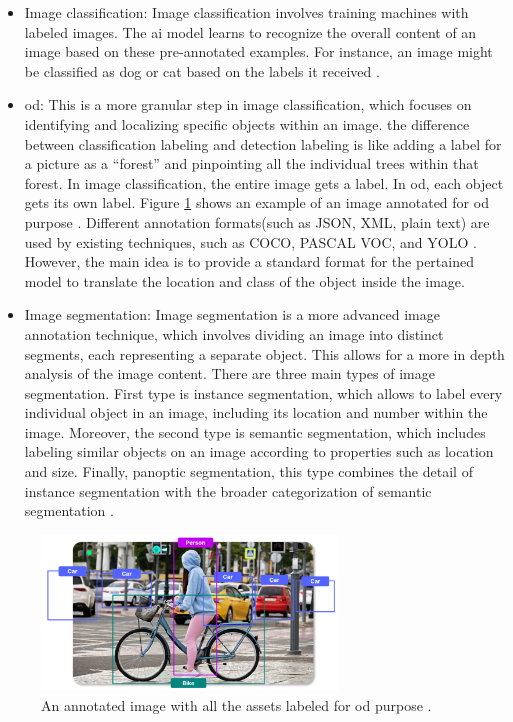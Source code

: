 \begin{itemize}
    \item Image classification: Image classification involves training machines with labeled images. The \gls{ai} model learns to recognize the overall content of an image based on these pre-annotated examples. For instance, an image might be classified as dog or cat based on the labels it received \cite{Annotation_Tech}. 
    \item \gls{od}: This is a more granular step in image classification, which focuses on identifying and localizing specific objects within an image. the difference between  classification labeling and detection labeling is like adding a label for a picture as a “forest” and pinpointing all the individual trees within that forest. In image classification, the entire image gets a label. In \gls{od}, each object gets its own label. Figure \ref{OD_Labeling} shows an example of an image annotated for \gls{od} purpose \cite{Annotation_Tech}. Different annotation formats(such as JSON, XML, plain text) are used by existing techniques, such as COCO, PASCAL VOC, and YOLO \cite{oD_Review}. However, the main idea is to provide a standard format for the pertained model to translate the location and class of the object inside the image.
    \item Image segmentation: Image segmentation is a more advanced image annotation technique, which involves dividing an image into distinct segments, each representing a separate object. This allows for a more in depth analysis of the image content. There are three main types of image segmentation. First type is instance segmentation, which allows to label every individual object in an image, including its location and number within the image. Moreover, the second type is semantic segmentation, which includes labeling similar objects on an image according to properties such as location and size. Finally, panoptic segmentation, this type combines the detail of instance segmentation with the broader categorization of semantic segmentation \cite{Annotation_Tech}.
\end{itemize}

\begin{figure}[!htb] 
    \centering
    \includegraphics[width=0.7\textwidth]{Figures/OD_Labeling.png}
    \caption{An annotated image with all the assets labeled for \gls{od} purpose \cite{Annotation_Tech}.}
    \label{OD_Labeling}
\end{figure}

